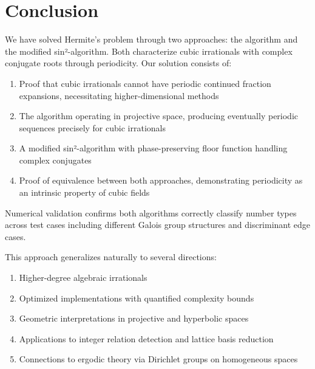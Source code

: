 \section{Conclusion}\label{sec:conclusion}

We have solved Hermite's problem through two approaches: the \HAPD algorithm and the modified sin²-algorithm. Both characterize cubic irrationals with complex conjugate roots through periodicity. Our solution consists of:

\begin{enumerate}
\item Proof that cubic irrationals cannot have periodic continued fraction expansions, necessitating higher-dimensional methods
\item The \HAPD algorithm operating in projective space, producing eventually periodic sequences precisely for cubic irrationals
\item A modified sin²-algorithm with phase-preserving floor function handling complex conjugates
\item Proof of equivalence between both approaches, demonstrating periodicity as an intrinsic property of cubic fields
\end{enumerate}

Numerical validation confirms both algorithms correctly classify number types across test cases including different Galois group structures and discriminant edge cases.

This approach generalizes naturally to several directions:
\begin{enumerate}
\item Higher-degree algebraic irrationals
\item Optimized implementations with quantified complexity bounds
\item Geometric interpretations in projective and hyperbolic spaces
\item Applications to integer relation detection and lattice basis reduction
\item Connections to ergodic theory via Dirichlet groups on homogeneous spaces
\end{enumerate}
